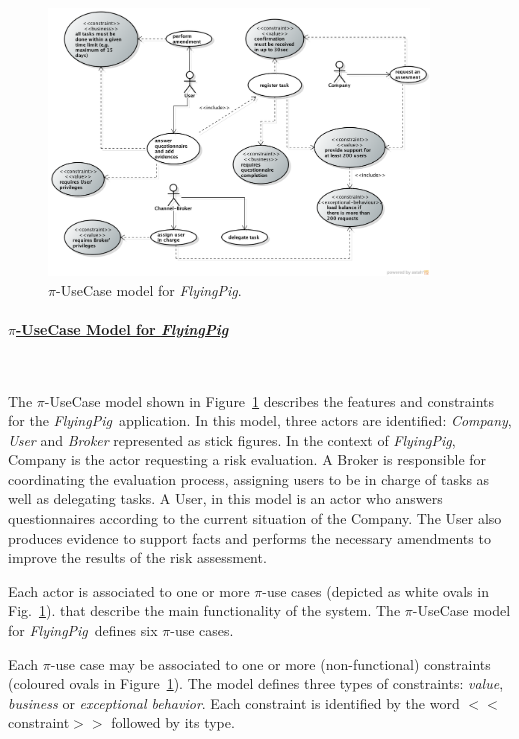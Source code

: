 \documentclass[12pt,twoside]{article}
\theoremstyle{plain}
\theoremstyle{plain}
\def\FlyingPig{\textsl{FlyingPig}\xspace}
\begin{document}
\begin{multicols}{2}
\begin{figure}
\centering
\includegraphics[width=0.9\textwidth]{UseCaseGeneral.png}
\caption{$\pi$-UseCase model for \FlyingPig.\label{fig:piUseCaseModel}}
\end{figure}


\paragraph{\underline{$\pi$-UseCase Model for \FlyingPig}}~

The $\pi$-UseCase model shown in Figure~\ref{fig:piUseCaseModel} describes the features and constraints for the \FlyingPig\ application.
In this model, three actors are identified: \textit{Company}, \textit{User} and \textit {Broker} represented as stick figures.
In the context of \FlyingPig, Company is the actor requesting a risk evaluation.
A Broker is  responsible for coordinating  the evaluation process, assigning users to be in charge of tasks as well as delegating tasks.
A User, in this model is an actor who answers questionnaires according to the current situation  of the Company.
The User also produces evidence to support facts and performs the necessary amendments to improve the results of the risk assessment.

Each actor is associated to one or more $\pi$-use cases (depicted as white ovals in Fig.~\ref{fig:piUseCaseModel}).
that describe the main functionality of the system.
The $\pi$-UseCase model for \FlyingPig\ defines six $\pi$-use cases.

Each $\pi$-use case may be associated to one or more (non-functional) constraints (coloured ovals in Figure~\ref{fig:piUseCaseModel}).
The mod\-el defines three types of constraints: \textit{value}, \textit{business} or \textit{exceptional behavior}.
Each constraint is identified by the word $<<$\textsf{constraint}$>>$ followed by its type.


\end{multicols}
\end{document}
